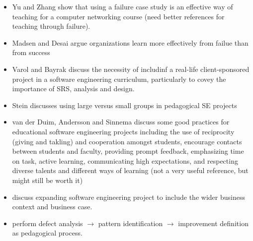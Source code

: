 \begin{itemize}
  \item Yu and Zhang \cite{yu_failureCaseStudy_anInstructuiveMethodForTeachingComputerNetworkEngineering_2010} show that using a failure case study is an effective way of teaching for a computer networking course (need better references for teaching through failure).
  \item Madsen and Desai \cite{madsen_failingToLearn_2010} argue organizations learn more effectively from failue than from success
  \item Varol and Bayrak \cite{varol_appliedSoftwareEngineeringEducation_2005} discuss the necessity of includinf a real-life client-sponsored project in a software engineering curriculum, particularly to covey the importance of SRS, analysis and design.
  \item Stein \cite{stein_usingLargeVsSmallGroupProjectsInCapstoneAndSoftwareEngineeringCourses_2002} discusses using large versus small groups in pedagogical SE projects
  \item van der Duim, Andersson and Sinnema \cite{vanderDuim_goodPracticesForEducationalSoftwareEngineeringProjects_2007} discuss some good practices for educational software engineering projects including the use of reciprocity (giving and takling) and cooperation amongst students, encourage contacts between students and faculty, providing prompt feedback, emphasizing time on task, active learning, communicating high expectations, and respecting diverse talents and different ways of learning (not a very useful reference, but might still be worth it)
  \item \cite{bolinger_fromStudentToTeacher_2010} discuss expanding software engineering project to include the wider business context and business case.
  \item \cite{peixoto_learningFromStudentsMistakesInSoftwareEngineeringCourses_2010} perform defect analysis $\rightarrow$ pattern identification $\rightarrow$  improvement definition as pedagogical process.
\end{itemize}